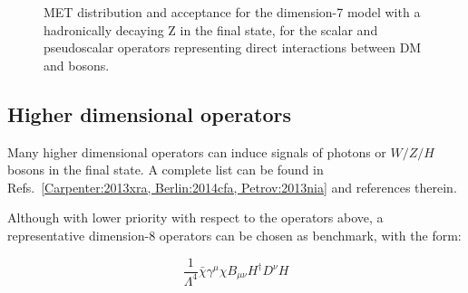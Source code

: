 \begin{figure}[h!]
  \centering
    \caption{MET distribution and acceptance for the dimension-7 model with a hadronically decaying Z in the final state,
    for the scalar and pseudoscalar operators representing direct interactions between DM and bosons.}
    \label{fig:EFTD7_EW_kinematics}
\end{figure}



\subsection{Higher dimensional operators}

Many higher dimensional operators can induce signals of photons or $W/Z/H$ bosons
in the final state. A complete list can be found in Refs.~\ref{Carpenter:2013xra, Berlin:2014cfa, Petrov:2013nia}
and references therein. 

Although with lower priority with respect to the operators above, 
a representative dimension-8 operators can be chosen as benchmark, with the form:
 
$$\frac{1}{\Lambda^4} \bar{\chi} \gamma^{\mu} \chi B_{\mu \nu} H^{\dagger} D^{\nu} H$$

